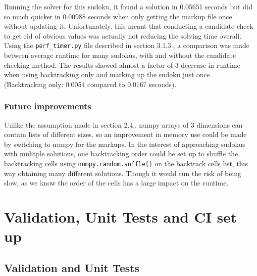 \documentclass[12pt]{report} %
\begin{document}
Running the solver for this sudoku, it found a solution in 0.05651 seconds but did so much quicker in 0.00988 seconds when only getting the markup file once without updating it. Unfortunately, this meant that conducting a candidate check to get rid of obvious values was actually not reducing the solving time overall. Using the \texttt{perf\_timer.py} file described in section 3.1.3., a comparison was made between average runtime for many sudokus, with and without the candidate checking method. The results showed almost a factor of 3 decrease in runtime when using backtracking only and marking up the sudoku just once (Backtracking only: 0.0054 compared to 0.0167 seconds).

\subsection{Future improvements}

Unlike the assumption made in section 2.4., numpy arrays of 3 dimensions can contain lists of different sizes, so an improvement in memory use could be made by switching to numpy for the markups\cite{numpy_vs_pandas}.
In the interest of approaching sudokus with mulitple solutions, one backtracking order could be set up to shuffle the backtracking cells using \texttt{numpy.random.suffle()} on the backtrack cells list, this way obtaining many different solutions. Though it would run the risk of being slow, as we know the order of the cells has a large impact on the runtime.

\chapter{Validation, Unit Tests and CI set up}

\section{Validation and Unit Tests}
\end{document}
